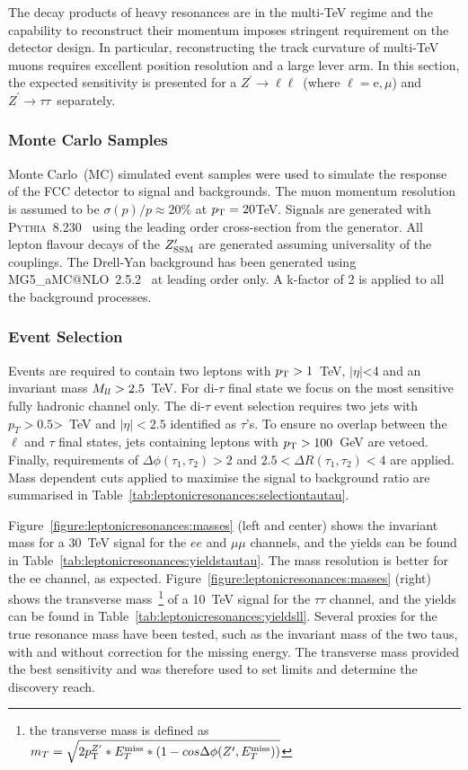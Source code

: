 \documentclass{cernrep}
\newcommand*{\Zptata}{\ensuremath{Z^{\prime}\rightarrow \tau\tau}}
\newcommand*{\Zpll}{\ensuremath{Z^{\prime}\rightarrow \ell\ell}}
\newcommand*{\met}{\ensuremath{E_{T}^{\rm{miss}}}}
\begin{document}
The decay products of heavy resonances are in the multi-TeV regime and the capability to reconstruct their momentum imposes stringent requirement on the detector design. In particular, reconstructing the track curvature of multi-TeV muons requires excellent position resolution and a large lever arm. In this section, the expected sensitivity is presented for a \Zpll\ (where $\ell=\mathrm{e},\mu$) and \Zptata\ separately.

\subsubsection{Monte Carlo Samples}
Monte Carlo~(MC) simulated event samples were used to simulate the response of the FCC detector to signal and backgrounds. The muon momentum resolution is assumed to be $\sigma(p)/p \approx 20\%$ at $p_{\text{T}}= 20 $TeV. Signals are generated with {\scshape Pythia}~8.230~\cite{Sjostrand:2014zea} using the leading order cross-section from the generator.
All lepton flavour decays of the $Z^{\prime}_{\mathrm{SSM}}$ are generated assuming universality of the couplings.
The Drell-Yan background has been generated using {\scshape MG5\_}a{\scshape MC@NLO}~2.5.2~\cite{Alwall:2014} at leading order only. A k-factor of 2 is applied to all the background processes.

\subsubsection{Event Selection}
Events are required to contain two leptons with $p_{\text{T}} > 1$~TeV, $|\eta|$<4 and an invariant mass $M_{ll} > 2.5$~TeV. For di-$\tau$ final state we focus on the most sensitive fully hadronic channel only. The di-$\tau$ event selection requires two jets with $p_{T} > 0.5$>~TeV and $|\eta|<2.5$ identified as $\tau$'s. To ensure no overlap between the $\ell$ and $\tau$ final states, jets containing leptons with $p_{\text{T}} > 100$~GeV are vetoed. Finally, requirements of $\Delta \phi(\tau_1, \tau_2)> 2$ and $2.5<\Delta R(\tau_1, \tau_2)<4$ are applied.
Mass dependent cuts applied to maximise the signal to background ratio are summarised in Table~\ref{tab:leptonicresonances:selectiontautau}.

Figure~\ref{figure:leptonicresonances:masses} (left and center) shows the invariant mass for a 30~TeV signal for the $ee$ and $\mu\mu$ channels, and the yields can be found in Table~\ref{tab:leptonicresonances:yieldstautau}. The mass resolution is better for the ee channel, as expected. Figure~\ref{figure:leptonicresonances:masses} (right) shows the transverse mass~\footnote{the transverse mass is defined as $m_{T}  =  \sqrt{2\ptZp*\met*(1-cos\Delta\phi(\Zp,\met))} $}
of a 10~TeV signal for the $\tau\tau$ channel, and the yields can be found in Table~\ref{tab:leptonicresonances:yieldsll}.
Several proxies for the true resonance mass have been tested, such as the invariant mass of the two taus, with and without correction for the missing energy. The transverse mass provided the best sensitivity and was therefore used to set limits and determine the discovery reach.
\end{document}
